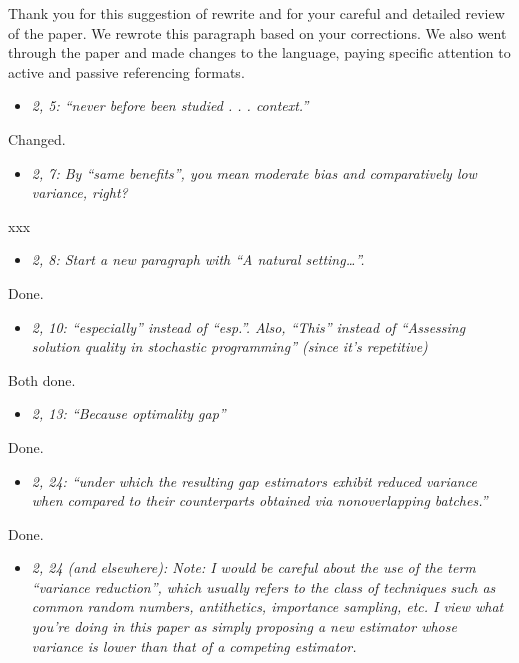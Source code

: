 \documentclass[11pt,notitlepage,onecolumn]{article}
\newcommand{\noi}{\noindent}
\begin{document}
\noi
Thank you for this suggestion of rewrite and for your careful and detailed review of the paper. 
We rewrote this paragraph based on your corrections.
We also went through the paper and made changes to the language, paying specific attention to active and passive referencing formats. 
\medskip 


\begin{itemize}
\item[] \textit{2, 5: ``never before been studied . . . context.''}
\end{itemize}

\noi
Changed.
\medskip 


\begin{itemize}
\item[] \textit{2, 7: By ``same benefits'', you mean moderate bias and comparatively low variance, right?}
\end{itemize}

\noi
xxx  
\medskip 


\begin{itemize}
\item[] \textit{2, 8: Start a new paragraph with ``A natural setting\ldots ''.}
\end{itemize}

\noi
Done.
\medskip 


\begin{itemize}
\item[] \textit{2, 10: ``especially'' instead of ``esp.''. 
Also, ``This'' instead of ``Assessing solution quality in stochastic programming'' (since it's repetitive)}
\end{itemize}

\noi
Both done.  
\medskip 


\begin{itemize}
\item[] \textit{2, 13: ``Because optimality gap''}
\end{itemize}

\noi
Done.
\medskip 


\begin{itemize}
\item[] \textit{2, 24: ``under which the resulting gap estimators exhibit reduced variance when compared to their counterparts obtained via nonoverlapping batches.''}
\end{itemize}

\noi
Done.
\medskip 


\begin{itemize}
\item[] \textit{2, 24 (and elsewhere): Note: I would be careful about the use of the term ``variance reduction'', which usually refers to the class of techniques such as common random numbers, antithetics, importance sampling, etc. 
I view what you're doing in this paper as simply proposing a new estimator whose variance is lower than that of a competing estimator.}
\end{itemize}
\end{document}
